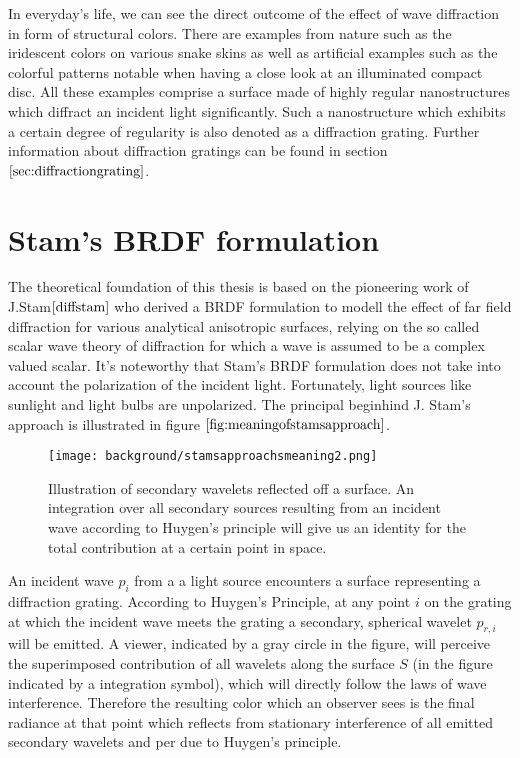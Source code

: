 In everyday's life, we can see the direct outcome of the effect of wave diffraction in form of structural colors. There are examples from nature such as the iridescent colors on various snake skins as well as artificial examples such as the colorful patterns notable when having a close look at an illuminated compact disc. All these examples comprise a surface made of highly regular nanostructures which diffract an incident light significantly. Such a nanostructure which exhibits a certain degree of regularity is also denoted as a diffraction grating. Further information about diffraction gratings can be found in section $\ref{sec:diffractiongrating}$.

\section{Stam's BRDF formulation}
\label{sec:sumstam}
The theoretical foundation of this thesis is based on the pioneering work of J.Stam$\cite{diffstam}$ who derived a BRDF formulation to modell the effect of far field diffraction for various analytical anisotropic surfaces, relying on the so called scalar wave theory of diffraction for which a wave is assumed to be a complex valued scalar. It's noteworthy that Stam's BRDF formulation does not take into account the polarization of the incident light. Fortunately, light sources like sunlight and light bulbs are unpolarized. The principal beginhind J. Stam's approach is illustrated in figure $\ref{fig:meaningofstamsapproach}$. 
\begin{figure}[H]
  \centering
  \texttt{[image: background/stamsapproachsmeaning2.png]}
  \caption[Idea behind Stam's approach]{Illustration of secondary wavelets reflected off a surface. An integration over all secondary sources resulting from an incident wave according to Huygen's principle will give us an identity for the total contribution at a certain point in space.}
  \label{fig:meaningofstamsapproach}  
\end{figure}

An incident wave $p_i$ from a a light source encounters a surface representing a diffraction grating. According to Huygen's Principle, at any point $i$ on the grating at which the incident wave meets the grating a secondary, spherical wavelet $p_{r,i}$ will be emitted. A viewer, indicated by a gray circle in the figure, will perceive the superimposed contribution of all wavelets along the surface $S$ (in the figure indicated by a integration symbol), which will directly follow the laws of wave interference. Therefore the resulting color which an observer sees is the final radiance at that point which reflects from stationary interference of all emitted secondary wavelets and per due to Huygen's principle. \\

